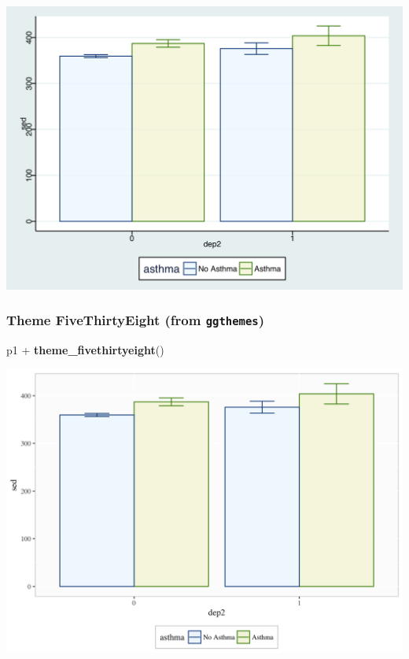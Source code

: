 \documentclass[]{tufte-book}
\newenvironment{Shaded}{}{}
\newcommand{\KeywordTok}[1]{\textcolor[rgb]{0.00,0.44,0.13}{\textbf{#1}}}
\newcommand{\StringTok}[1]{\textcolor[rgb]{0.25,0.44,0.63}{#1}}
\newcommand{\OperatorTok}[1]{\textcolor[rgb]{0.40,0.40,0.40}{#1}}
\newcommand{\NormalTok}[1]{#1}
\theoremstyle{definition}
\theoremstyle{definition}
\theoremstyle{remark}
\begin{document}
\includegraphics{_main_files/figure-latex/unnamed-chunk-153-1}

\subsubsection*{\texorpdfstring{Theme FiveThirtyEight (from
\texttt{ggthemes})}{Theme FiveThirtyEight (from ggthemes)}}\label{theme-fivethirtyeight-from-ggthemes}

\begin{Shaded}
\begin{Highlighting}[]
\NormalTok{p1 }\OperatorTok{+}\StringTok{ }\KeywordTok{theme_fivethirtyeight}\NormalTok{()}
\end{Highlighting}
\end{Shaded}

\includegraphics{_main_files/figure-latex/unnamed-chunk-154-1}
\end{document}
